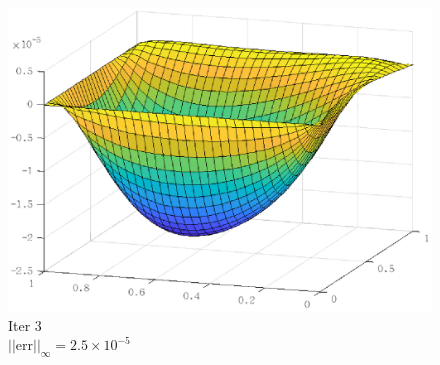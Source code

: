 \documentclass[lang=cn,10pt]{elegantbook}
\begin{document}
\begin{figure}[H]
\begin{minipage}[t]{0.22\linewidth}
    \includegraphics[width=0.9\linewidth]{figure/3-5-3.eps}
    \caption*{\small Iter 3 \\ $||\text{err}||_\infty=2.5\times 10^{-5}$}
  \end{minipage}
\end{figure}
\end{document}
